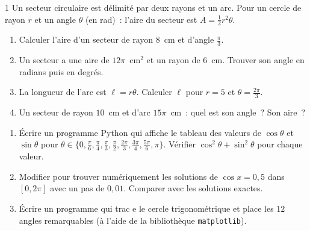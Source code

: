 \begin{probleme}{1}
Un secteur circulaire est d\'elimit\'e par deux rayons et un arc.
Pour un cercle de rayon $r$ et un angle $\theta$ (en rad)~:
l'aire du secteur est $A=\frac{1}{2}r^2\theta$.
\begin{enumerate}
  \item Calculer l'aire d'un secteur de rayon $8$~cm et d'angle $\frac{\pi}{3}$.
  \item Un secteur a une aire de $12\pi$~cm$^2$ et un rayon de $6$~cm.
        Trouver son angle en radians puis en degr\'es.
  \item La longueur de l'arc est $\ell=r\theta$.
        Calculer $\ell$ pour $r=5$ et $\theta=\frac{2\pi}{3}$.
  \item Un secteur de rayon $10$~cm et d'arc $15\pi$~cm~:
        quel est son angle~? Son aire~?
\end{enumerate}
\end{probleme}

\begin{challenge}
\begin{enumerate}
  \item \'Ecrire un programme Python qui affiche le tableau des valeurs
        de $\cos\theta$ et $\sin\theta$ pour $\theta\in\{0, \frac{\pi}{6}, \frac{\pi}{4},
        \frac{\pi}{3}, \frac{\pi}{2}, \frac{2\pi}{3}, \frac{3\pi}{4}, \frac{5\pi}{6}, \pi\}$.
        V\'erifier $\cos^2\theta+\sin^2\theta$ pour chaque valeur.
  \item Modifier pour trouver num\'eriquement les solutions de
        $\cos x = 0{,}5$ dans $[0, 2\pi]$ avec un pas de $0{,}01$.
        Comparer avec les solutions exactes.
  \item \'Ecrire un programme qui trac e le cercle trigonom\'etrique
        et place les $12$ angles remarquables
        (\`a l'aide de la biblioth\`eque \texttt{matplotlib}).
\end{enumerate}
\end{challenge}

